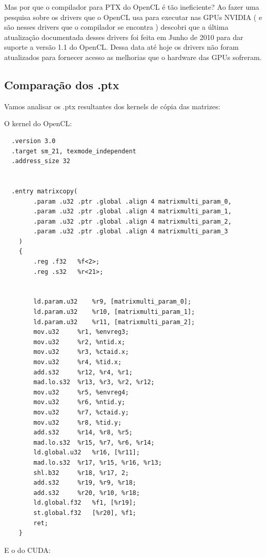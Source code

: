 Mas por que o compilador para PTX do OpenCL é tão ineficiente? Ao fazer uma pesquisa sobre os drivers que o OpenCL usa para executar nas
GPUs NVIDIA ( e são nesses drivers que o compilador se encontra ) descobri que a última atualização documentada desses drivers foi feita 
em Junho de 2010 para dar suporte a versão 1.1 do OpenCL. Dessa data até hoje os drivers não foram atualizados para fornecer acesso as
melhorias que o hardware das GPUs sofreram.

\subsection{Comparação dos .ptx}

Vamos analisar os .ptx resultantes dos kernels de cópia das matrizes:

O kernel do OpenCL: 

\begin{lstlisting}
  .version 3.0
  .target sm_21, texmode_independent
  .address_size 32


  .entry matrixcopy(
	    .param .u32 .ptr .global .align 4 matrixmulti_param_0,
	    .param .u32 .ptr .global .align 4 matrixmulti_param_1,
	    .param .u32 .ptr .global .align 4 matrixmulti_param_2,
	    .param .u32 .ptr .global .align 4 matrixmulti_param_3
    )
    {
	    .reg .f32 	%f<2>;
	    .reg .s32 	%r<21>;


	    ld.param.u32 	%r9, [matrixmulti_param_0];
	    ld.param.u32 	%r10, [matrixmulti_param_1];
	    ld.param.u32 	%r11, [matrixmulti_param_2];
	    mov.u32 	%r1, %envreg3;
	    mov.u32 	%r2, %ntid.x;
	    mov.u32 	%r3, %ctaid.x;
	    mov.u32 	%r4, %tid.x;
	    add.s32 	%r12, %r4, %r1;
	    mad.lo.s32 	%r13, %r3, %r2, %r12;
	    mov.u32 	%r5, %envreg4;
	    mov.u32 	%r6, %ntid.y;
	    mov.u32 	%r7, %ctaid.y;
	    mov.u32 	%r8, %tid.y;
	    add.s32 	%r14, %r8, %r5;
	    mad.lo.s32 	%r15, %r7, %r6, %r14;
	    ld.global.u32 	%r16, [%r11];
	    mad.lo.s32 	%r17, %r15, %r16, %r13;
	    shl.b32 	%r18, %r17, 2;
	    add.s32 	%r19, %r9, %r18;
	    add.s32 	%r20, %r10, %r18;
	    ld.global.f32 	%f1, [%r19];
	    st.global.f32 	[%r20], %f1;
	    ret;
    }
\end{lstlisting}

E o do CUDA:

